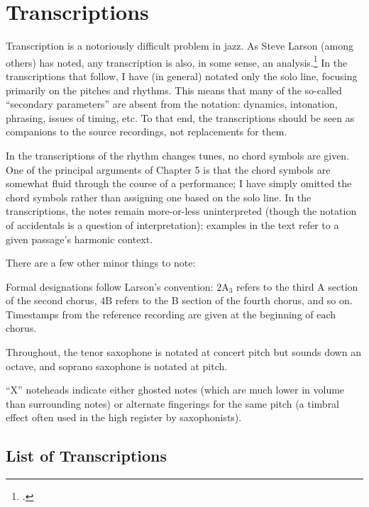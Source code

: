 \doublespacing
\chapter{Transcriptions}
\addtocspace
\singlespacing

Transcription is a notoriously difficult problem in jazz. As Steve Larson
(among others) has noted, any transcription is also, in some sense, an
analysis.\footcite[2]{larson:2009} In the transcriptions that follow, I have
(in general) notated only the solo line, focusing primarily on the pitches and
rhythms. This means that many of the so-called ``secondary parameters'' are
absent from the notation: dynamics, intonation, phrasing, issues of timing,
etc. To that end, the transcriptions should be seen as companions to the
source recordings, not replacements for them.

In the transcriptions of the rhythm changes tunes, no chord symbols are given.
One of the principal arguments of Chapter 5 is that the chord symbols are
somewhat fluid through the course of a performance; I have simply omitted the
chord symbols rather than assigning one based on the solo line. In the
transcriptions, the notes remain more-or-less uninterpreted (though the
notation of accidentals is a question of interpretation); examples in the text
refer to a given passage's harmonic context.

\vspace{\baselineskip}
\noindent There are a few other minor things to note:
\begin{compactitem}
  \item Formal designations follow Larson's convention: $2\mathrm{A}_3$ refers
    to the third A section of the second chorus, $4\mathrm{B}$ refers to the B
    section of the fourth chorus, and so on. Timestamps from the reference
    recording are given at the beginning of each chorus.
  \item Throughout, the tenor saxophone is notated at concert pitch but sounds
    down an octave, and soprano saxophone is notated at pitch.
  \item ``X'' noteheads indicate either ghosted notes (which are much lower in
    volume than surrounding notes) or alternate fingerings for the same pitch
    (a timbral effect often used in the high register by saxophonists).
\end{compactitem}

\section*{List of Transcriptions}


